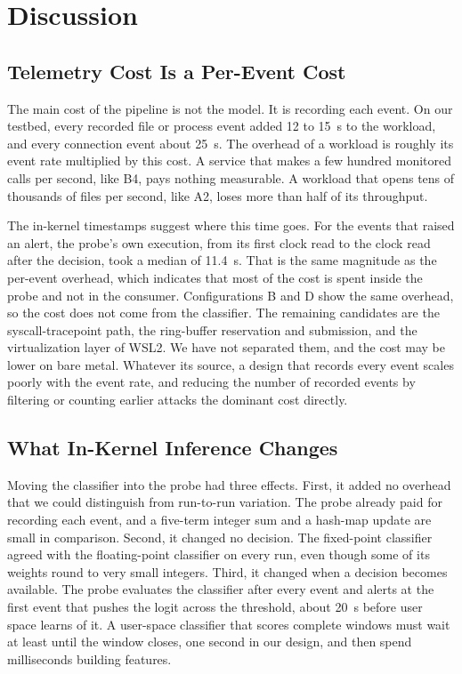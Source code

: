 \section{Discussion}
\label{sec:discussion}

\subsection{Telemetry Cost Is a Per-Event Cost}

The main cost of the pipeline is not the model. It is recording each event. On our testbed, every recorded file or process event added 12 to 15~\textmu s to the workload, and every connection event about 25~\textmu s. The overhead of a workload is roughly its event rate multiplied by this cost. A service that makes a few hundred monitored calls per second, like B4, pays nothing measurable. A workload that opens tens of thousands of files per second, like A2, loses more than half of its throughput.

The in-kernel timestamps suggest where this time goes. For the events that raised an alert, the probe's own execution, from its first clock read to the clock read after the decision, took a median of 11.4~\textmu s. That is the same magnitude as the per-event overhead, which indicates that most of the cost is spent inside the probe and not in the consumer. Configurations B and D show the same overhead, so the cost does not come from the classifier. The remaining candidates are the syscall-tracepoint path, the ring-buffer reservation and submission, and the virtualization layer of WSL2. We have not separated them, and the cost may be lower on bare metal. Whatever its source, a design that records every event scales poorly with the event rate, and reducing the number of recorded events by filtering or counting earlier attacks the dominant cost directly.

\subsection{What In-Kernel Inference Changes}

Moving the classifier into the probe had three effects. First, it added no overhead that we could distinguish from run-to-run variation. The probe already paid for recording each event, and a five-term integer sum and a hash-map update are small in comparison. Second, it changed no decision. The fixed-point classifier agreed with the floating-point classifier on every run, even though some of its weights round to very small integers. Third, it changed when a decision becomes available. The probe evaluates the classifier after every event and alerts at the first event that pushes the logit across the threshold, about 20~\textmu s before user space learns of it. A user-space classifier that scores complete windows must wait at least until the window closes, one second in our design, and then spend milliseconds building features.

